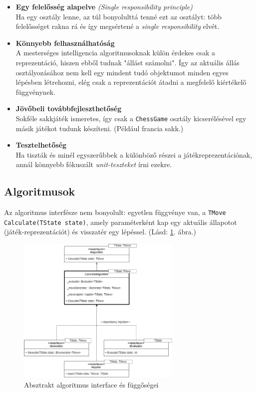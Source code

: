 \documentclass[twoside, a4paper, 12pt]{article}
\begin{document}
\begin{itemize}
	\item \textbf{Egy felelősség alapelve} \textit{(Single responsibility principle)}\cite{SingleResponsibilityHu}~\cite{SingleResponsibilityEn}~\cite{SOLID}~ \\
	Ha egy osztály lenne, az túl bonyolulttá tenné ezt az osztályt: több felelősséget rakna rá és így megsértené a \textit{single responsibility} elvét.
	
	\item \textbf{Könnyebb felhasználhatóság} \\
	A mesterséges intelligencia algoritmusoknak külön érdekes csak a reprezentáció, hiszen ebből tudnak "állást számolni". Így az aktuális állás osztályozásához nem kell egy mindent tudó objektumot minden egyes lépésben létrehozni, elég csak a reprezentációt átadni a megfelelő kiértékelő függvénynek.
	
	\item \textbf{Jövőbeli továbbfejleszthetőség} \\
	Sokféle sakkjáték ismeretes, így csak a \texttt{ChessGame} osztály kicserélésével egy másik játékot tudunk készíteni. (Például francia sakk.)
	
	\item \textbf{Tesztelhetőség} \\
	Ha tiszták és minél egyszerűbbek a különböző részei a játékreprezentációnak, annál könnyebb fókuszált \textit{unit-teszteket} írni ezekre.
\end{itemize}

\subsection{Algoritmusok}
Az algoritmus interfésze nem bonyolult: egyetlen függvénye van, a \texttt{TMove Calculate(TState state)}, amely paraméterként kap egy aktuális állapotot (játék-reprezentációt) és visszatér egy lépéssel. (Lásd: \ref{fig:algorithmAbstractDiagram}. ábra.)

\begin{figure}[htbp]
	\centering
	\includegraphics[width=0.7\textwidth]{img/algorithmAbstractDiagram.png}
	\caption{Absztrakt algoritmus interface és függőségei}
	\label{fig:algorithmAbstractDiagram}
\end{figure}
\end{document}
